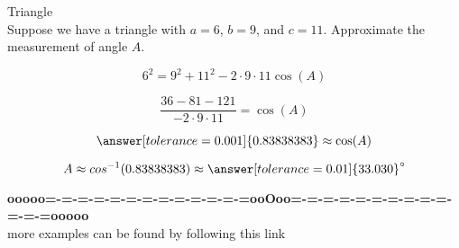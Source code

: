 \documentclass{ximera}
\begin{document}
\begin{example} Triangle \\

Suppose we have a triangle with $a=6$, $b=9$, and $c=11$. Approximate the measurement of angle $A$.

\[    6^2 = 9^2  +  11^2  - 2 \cdot 9 \cdot 11 \cos(A)   \]


\[    \frac{36 - 81 - 121}{- 2 \cdot 9 \cdot 11} =    \cos(A)   \]

\[  \answer[tolerance=0.001]{0.83838383} \approx \cos(A)  \]


\[ A \approx cos^{-1}(0.83838383)  \approx \answer[tolerance=0.01]{33.030}^{\circ}   \]


\end{example}











\begin{center}
\textbf{\textcolor{green!50!black}{ooooo=-=-=-=-=-=-=-=-=-=-=-=-=ooOoo=-=-=-=-=-=-=-=-=-=-=-=-=ooooo}} \\

more examples can be found by following this link\\ 

\end{center}
\end{document}
